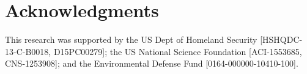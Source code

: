 \section*{Acknowledgments}
This research was supported by the US Dept of Homeland Security [HSHQDC-13-C-B0018, D15PC00279]; the US National Science Foundation [ACI-1553685, CNS-1253908]; and the Environmental Defense Fund [0164-000000-10410-100].


